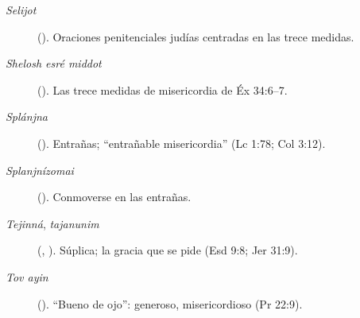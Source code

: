 \begin{description}
\item[\emph{Selijot}] (). Oraciones penitenciales judías centradas en las trece medidas.
\item[\emph{Shelosh esré middot}] (). Las trece medidas de misericordia de Éx 34:6--7.
\item[\emph{Splánjna}] (). Entrañas; ``entrañable misericordia'' (Lc 1:78; Col 3:12).
\item[\emph{Splanjnízomai}] (). Conmoverse en las entrañas.
\item[\emph{Tejinná}, \emph{tajanunim}] (, ). Súplica; la gracia que se pide (Esd 9:8; Jer 31:9).
\item[\emph{Tov ayin}] (). ``Bueno de ojo'': generoso, misericordioso (Pr 22:9).
\end{description}

